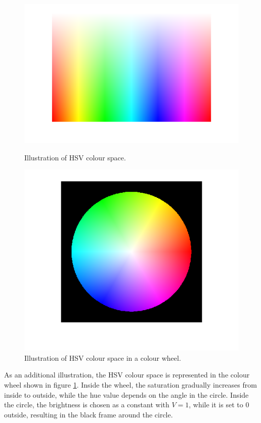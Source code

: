 \begin{figure}[H]
	\centering
	\begin{minipage}[t]{0.4\textwidth}
		\includegraphics[width=\textwidth]{images/colourscalevhs.png}
		\caption{Illustration of HSV colour space.}
		\label{fig:colourscalehsv}
	\end{minipage}
	\begin{minipage}[t]{0.4\textwidth}
		\includegraphics[width=\textwidth]{images/colourwheelvhs}
		\caption{Illustration of HSV colour space in a colour wheel.}
		\label{fig:colourwheelhsv}
	\end{minipage}
\end{figure}
As an additional illustration, the HSV colour space is represented in the colour wheel shown in figure \ref{fig:colourwheelhsv}. Inside the wheel, the saturation gradually increases from inside to outside, while the hue value depends on the angle in the circle. Inside the circle, the brightness is chosen as a constant with $V=1$, while it is set to $0$ outside, resulting in the black frame around the circle.

